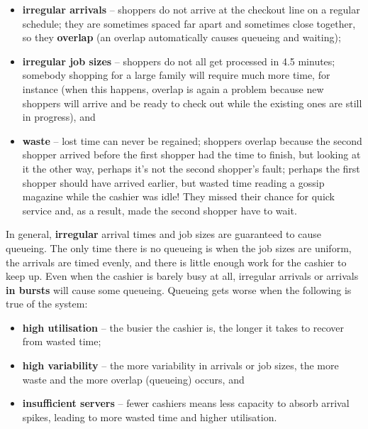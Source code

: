  \begin{itemize}[noitemsep]
 \item \textbf{irregular arrivals} -- shoppers do not arrive at the checkout line on a regular schedule; they are sometimes spaced far apart and sometimes close together, so they \textbf{overlap} (an overlap automatically causes queueing and waiting);
 \item \textbf{irregular job sizes} -- shoppers do not all get processed in 4.5 minutes; somebody shopping for a large family will require much more time, for instance (when this happens, overlap is again a problem because new shoppers will arrive and be ready to check out while the existing ones are still in progress), and  
\item \textbf{waste} -- lost time can never be regained; shoppers overlap because the second shopper arrived before the first shopper had the time to finish, but looking at it the other way, perhaps it's not the second shopper's fault; perhaps the first shopper should have arrived earlier, but wasted time reading a gossip magazine while the cashier was idle! They missed their chance for quick service and, as a result,  made the second shopper have to wait.
\end{itemize}
In general, \textbf{irregular} arrival times and job sizes are guaranteed to cause queueing. The only time there is no queueing is when the job sizes are uniform, the arrivals are timed evenly, and there is little enough work for the cashier to keep up. Even when the cashier is barely busy at all, irregular arrivals or arrivals \textbf{in bursts} will cause some queueing.
\newl Queueing gets worse when the following is true of the system:
\begin{itemize}[noitemsep]
\item \textbf{high utilisation} -- the busier the cashier is, the longer it takes to recover from wasted time; 
\item \textbf{high variability} -- the more variability in arrivals or job sizes, the more waste and the more overlap (queueing) occurs, and 
\item \textbf{insufficient servers} -- fewer cashiers means less capacity to absorb arrival spikes, leading to more wasted time and higher utilisation.
\end{itemize}